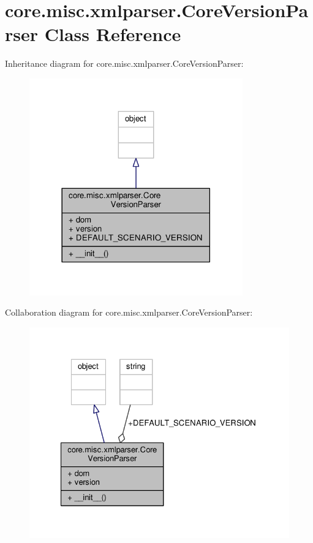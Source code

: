 \hypertarget{classcore_1_1misc_1_1xmlparser_1_1_core_version_parser}{\section{core.\+misc.\+xmlparser.\+Core\+Version\+Parser Class Reference}
\label{classcore_1_1misc_1_1xmlparser_1_1_core_version_parser}
}


Inheritance diagram for core.\+misc.\+xmlparser.\+Core\+Version\+Parser\+:
\nopagebreak
\begin{figure}[H]
\begin{center}
\leavevmode
\includegraphics[width=261pt]{classcore_1_1misc_1_1xmlparser_1_1_core_version_parser__inherit__graph}
\end{center}
\end{figure}


Collaboration diagram for core.\+misc.\+xmlparser.\+Core\+Version\+Parser\+:
\nopagebreak
\begin{figure}[H]
\begin{center}
\leavevmode
\includegraphics[width=327pt]{classcore_1_1misc_1_1xmlparser_1_1_core_version_parser__coll__graph}
\end{center}
\end{figure}
